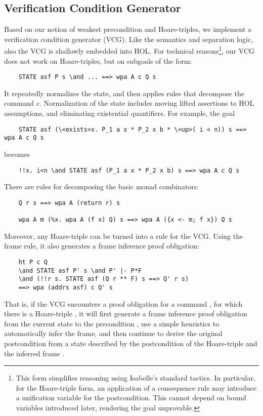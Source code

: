 \documentclass[runningheads]{llncs}
\begin{document}
  \subsection{Verification Condition Generator}
  Based on our notion of weakest precondition and Hoare-triples, we implement a verification condition generator (VCG).
  Like the semantics and separation logic, also the VCG is shallowly embedded into HOL.
  For technical reasons\footnote{
    This form simplifies reasoning using Isabelle's standard tactics. In particular, for the Hoare-triple form,
    an application of a consequence rule may introduce a unification variable for the
    postcondition. This cannot depend on bound variables introduced later, rendering the goal unprovable.
  }, our VCG does not work on Hoare-triples, but on subgoals of the form:
  \begin{lstlisting}
    STATE asf P s \and ... ==> wpa A c Q s
  \end{lstlisting}
  It repeatedly normalizes the state, and then applies rules that decompose the command $c$.
  Normalization of the state includes moving lifted assertions to HOL assumptions, and eliminating existential quantifiers.
  For example, the goal
  \begin{lstlisting}
    STATE asf (\<exists>x. P_1 a x * P_2 x b * \<up>( i < n)) s ==> wpa A c Q s
  \end{lstlisting}
  becomes
  \begin{lstlisting}
    !!x. i<n \and STATE asf (P_1 a x * P_2 x b) s ==> wpa A c Q s
  \end{lstlisting}
  There are rules for decomposing the basic monad combinators:
  \begin{lstlisting}
    Q r s ==> wpa A (return r) s

    wpa A m (%x. wpa A (f x) Q) s ==> wpa A ({x <- m; f x}) Q s
  \end{lstlisting}
  Moreover, any Hoare-triple can be turned into a rule for the VCG.
  Using the frame rule, it also generates a frame inference proof obligation:
  \begin{lstlisting}
    ht P c Q
    \and STATE asf P' s \and P' |- P*F
    \and (!!r s. STATE asf (Q r ** F) s ==> Q' r s)
    ==> wpa (addrs asf) c Q' s
  \end{lstlisting}
  That is, if the VCG encounters a proof obligation for a command , for which there is a Hoare-triple ,
  it will first generate a frame inference proof obligation from the current state  to the precondition ,
  use a simple heuristics to automatically infer the frame,
  and then continue to derive the original postcondition  from a state described by the postcondition 
  of the Hoare-triple and the inferred frame .
\end{document}
